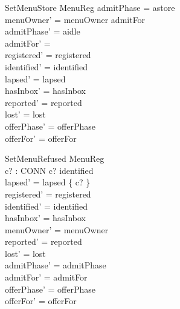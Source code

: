 \documentclass[a4paper,10pt,fleqn]{article}
\begin{document}
\begin{schema}{SetMenuStore}
  \Delta MenuReg
\where
  admitPhase = astore \\
  menuOwner' = menuOwner \cup admitFor \\
  admitPhase' = aidle \\
  admitFor' = \emptyset \\
  registered' = registered \\
  identified' = identified \\
  lapsed' = lapsed \\
  hasInbox' = hasInbox \\
  reported' = reported \\
  lost' = lost \\
  offerPhase' = offerPhase \\
  offerFor' = offerFor
\end{schema}

\begin{schema}{SetMenuRefused}
  \Delta MenuReg \\
  c? : CONN
\where
  c? \notin identified \\
  lapsed' = lapsed \setminus \{ c? \} \\
  registered' = registered \\
  identified' = identified \\
  hasInbox' = hasInbox \\
  menuOwner' = menuOwner \\
  reported' = reported \\
  lost' = lost \\
  admitPhase' = admitPhase \\
  admitFor' = admitFor \\
  offerPhase' = offerPhase \\
  offerFor' = offerFor
\end{schema}
\end{document}

